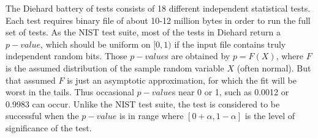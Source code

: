 The Diehard battery of tests consists of 18 different independent statistical tests. 
Each test requires binary file of about 10-12 million bytes in order to run the full set of tests. 
As the NIST test suite, most of the tests in Diehard return a $p-value$, which should be uniform on $[0,1)$ if the input file 
contains truly independent random bits.  Those $p-value$s are obtained by                
$p=F(X)$, where $F$ is the assumed distribution of the sample random variable $X$ (often normal). 
But that assumed $F$ is just an asymptotic approximation, for which the fit will be worst             
in the tails. Thus occasional $p-value$s near 0 or 1, such as 0.0012 or 0.9983 can occur. Unlike the NIST test suite, the test is considered to be successful when
the $p-value$ is in range where $[0 + \alpha , 1 -\alpha ]$ is the level of significance of the test.                
  
